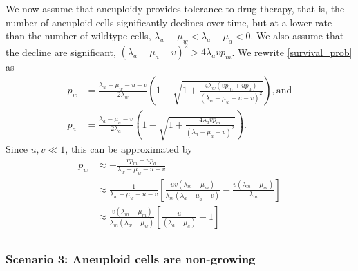 \documentclass[12pt]{extarticle}
\begin{document}
We now assume that aneuploidy provides tolerance to drug therapy, that is, the number of aneuploid cells significantly declines over time, but at a lower rate than the number of wildtype cells, $\lambda_w - \mu_w < \lambda_a - \mu_a < 0$. We also assume that the decline are significant, $\left(\lambda_a-\mu_a-v\right)^2 > 4\lambda_a v p_m$.
We rewrite \cref{survival_prob} as
\begin{align*}
p_w&=\frac{\lambda_w-\mu_w-u-v}{2\lambda_w}\left(1-\sqrt{1+\frac{4\lambda_w\left(vp_m+up_a\right)}{\left(\lambda_w-\mu_w-u-v\right)^2}}\right) ,
\text{and} \\
p_a&=\frac{\lambda_a-\mu_a-v}{2\lambda_a}\left(1-\sqrt{1+\frac{4\lambda_avp_m}{\left(\lambda_a-\mu_a-v\right)^2}}\right) .
\end{align*}
Since $u,v\ll1$, this can be approximated by %
\begin{equation}\label{survprobwinitial}
\begin{aligned}
p_w&\approx-\frac{vp_m+up_a}{\lambda_w-\mu_w-u-v}\\
&\approx\frac{1}{\lambda_w-\mu_w-u-v}\left[\frac{uv\left(\lambda_m-\mu_m\right)}{\lambda_m\left(\lambda_a-\mu_a-v\right)}-\frac{v\left(\lambda_m-\mu_m\right)}{\lambda_m}\right]\\ %
&\approx\frac{v\left(\lambda_m-\mu_m\right)}{\lambda_m\left(\lambda_w-\mu_w\right)}\left[\frac{u}{\left(\lambda_a-\mu_a\right)}-1\right]\\
\end{aligned}
\end{equation}

\subsubsection*{Scenario 3: Aneuploid cells are non-growing} %
\end{document}
